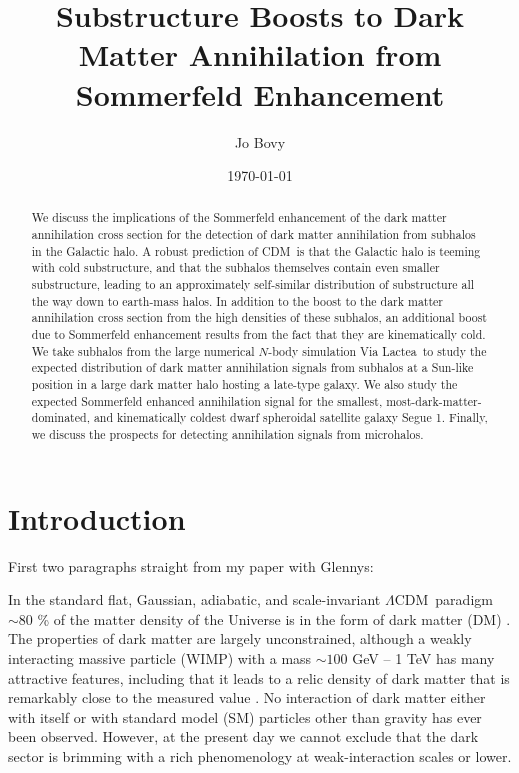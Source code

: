 \documentclass[aps,prd,twocolumn,amsmath,amssymb,floatfix,nofootinbib,10pt]{revtex4}
\newcommand{\VL}{Via Lactea}
\newcommand{\CDM}{CDM}
\newcommand{\LCDM}{\ensuremath{\Lambda}\CDM}
\newcommand{\DM}{DM}
\newcommand{\SM}{SM}
\begin{document}
\title{Substructure Boosts to Dark Matter Annihilation from Sommerfeld Enhancement}
\author{Jo Bovy} 

\date{\today}

\begin{abstract}
We discuss the implications of the Sommerfeld enhancement of the dark
matter annihilation cross section for the detection of dark matter
annihilation from subhalos in the Galactic halo. A robust prediction
of \CDM\ is that the Galactic halo is teeming with cold substructure,
and that the subhalos themselves contain even smaller substructure,
leading to an approximately self-similar distribution of substructure
all the way down to earth-mass halos. In addition to the boost to the
dark matter annihilation cross section from the high densities of
these subhalos, an additional boost due to Sommerfeld enhancement
results from the fact that they are kinematically cold. We take
subhalos from the large numerical $N$-body simulation \VL\ to study
the expected distribution of dark matter annihilation signals from
subhalos at a Sun-like position in a large dark matter halo hosting a
late-type galaxy. We also study the expected Sommerfeld enhanced
annihilation signal for the smallest, most-dark-matter-dominated, and
kinematically coldest dwarf spheroidal satellite galaxy Segue
1. Finally, we discuss the prospects for detecting annihilation
signals from microhalos.
\end{abstract}

\maketitle

\section{Introduction}

First two paragraphs straight from my paper with Glennys:

In the standard flat, Gaussian, adiabatic, and scale-invariant \LCDM\
paradigm $\sim\!80$ \% of the matter density of the Universe is in the
form of dark matter (\DM) \cite{2008arXiv0803.0547K}. The properties
of dark matter are largely unconstrained, although a weakly
interacting massive particle (WIMP) with a mass $\sim\!100$ GeV -- 1
TeV has many attractive features, including that it leads to a relic
density of dark matter that is remarkably close to the measured value
\cite{1996PhR...267..195J}. No interaction of dark matter either with
itself or with standard model (\SM) particles other than gravity has
ever been observed. However, at the present day we cannot exclude that
the dark sector is brimming with a rich phenomenology at
weak-interaction scales or lower.
\end{document}
